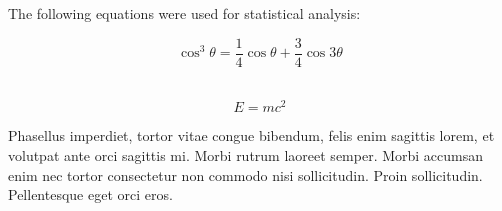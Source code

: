 \documentclass[a0paper,fontscale=0.35]{baposter} %
\begin{document}
\begin{poster}
{The following equations were used for statistical analysis:

\begin{equation}
\cos^3 \theta =\frac{1}{4}\cos\theta+\frac{3}{4}\cos 3\theta
\label{eq:refname}
\end{equation}\

\begin{equation}
E = mc^{2}
\label{eqn:Einstein}
\end{equation}

Phasellus imperdiet, tortor vitae congue bibendum, felis enim sagittis lorem, et volutpat ante orci sagittis mi. Morbi rutrum laoreet semper. Morbi accumsan enim nec tortor consectetur non commodo nisi sollicitudin. Proin sollicitudin. Pellentesque eget orci eros.
}









\end{poster}
\end{document}
